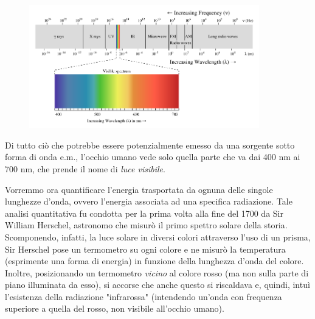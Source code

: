 \begin{figure}[h!!]
    \centering
    \includegraphics[width=10cm]{spettro em.png}
\end{figure}

Di tutto ciò che potrebbe essere potenzialmente emesso da una sorgente sotto forma di onda e.m., l'occhio umano vede solo quella parte che va dai 400 nm ai 700 nm, che prende il nome di \textit{luce visibile}.

Vorremmo ora quantificare l'energia trasportata da ognuna delle singole lunghezze d'onda, ovvero l'energia associata ad una specifica radiazione. Tale analisi quantitativa fu condotta per la prima volta alla fine del 1700 da Sir William Herschel, astronomo che misurò il primo spettro solare della storia. Scomponendo, infatti, la luce solare in diversi colori attraverso l'uso di un prisma, Sir Herschel pose un termometro su ogni colore e ne misurò la temperatura (esprimente una forma di energia) in funzione della lunghezza d'onda del colore. Inoltre, posizionando un termometro \textit{vicino} al colore rosso (ma non sulla parte di piano illuminata da esso), si accorse che anche questo si riscaldava e, quindi, intuì l'esistenza della radiazione "infrarossa" (intendendo un'onda con frequenza superiore a quella del rosso, non visibile all'occhio umano).

